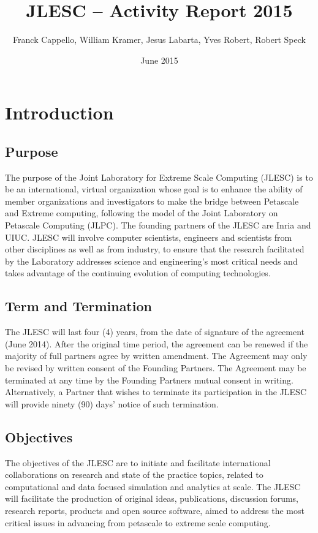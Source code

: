 \documentclass[12pt]{article}
\title{JLESC -- Activity Report 2015}
\author{Franck Cappello, William Kramer, Jesus Labarta, Yves Robert, Robert Speck}
\date{June 2015}
\theoremstyle{definition}
\begin{document}
\maketitle
\thispagestyle{empty}
\vspace*{0.5cm}



\newpage

\tableofcontents

\newpage
\section{Introduction}
\label{sec.intro}

\subsection{Purpose} 
The purpose of the Joint Laboratory for Extreme Scale Computing (JLESC) is to be an international, virtual organization whose goal is to enhance the ability of member organizations and investigators to make the bridge between Petascale and Extreme computing, following the model of the Joint Laboratory on Petascale Computing (JLPC). The founding partners of the JLESC are Inria and UIUC. JLESC will involve computer scientists, engineers and scientists from other disciplines as well as from industry, to ensure that the research facilitated by the Laboratory addresses science and engineering's most critical needs and takes advantage of the continuing evolution of computing technologies.

\subsection{Term and Termination} 
The JLESC will last four (4) years, from the date of signature of the agreement (June 2014). After the original time period, the agreement can be renewed if the majority of full partners agree by  written amendment. The Agreement may only be revised by written consent of the Founding Partners.
The Agreement may be terminated at any time by the Founding Partners mutual consent in writing. Alternatively, a Partner that wishes to terminate its participation in the JLESC will provide ninety (90) days' notice of such termination.

\subsection{Objectives} 
The objectives of the JLESC are to initiate and facilitate international collaborations on research and state of the practice topics, related to computational and data focused simulation and analytics at scale. The JLESC will facilitate the production of original ideas, publications, discussion forums, research reports, products and open source software, aimed to address the most critical issues in advancing from petascale to extreme scale computing.
\end{document}
